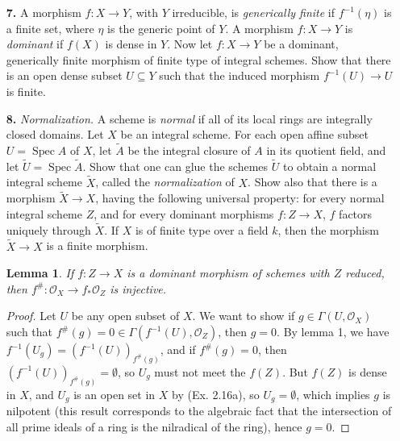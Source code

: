 \documentclass{article}
\newcommand{\OO}{\mathscr{O}}
\DeclareMathOperator{\spec}{Spec}
\newtheorem{lemma}{Lemma}
\begin{document}
\begin{enumerate} [label=\textbf{\arabic*.}, leftmargin=0em]
\item[\textbf{7.}] A morphism $f : X \to Y$, with $Y$ irreducible, is \textit{generically finite} if $f^{-1}(\eta)$ is a finite set, where $\eta$ is the generic point of $Y$. A morphism $f : X \to Y$ is \textit{dominant} if $f(X)$ is dense in $Y$. Now let $f : X \to Y$ be a dominant, generically finite morphism of finite type of integral schemes. Show that there is an open dense subset $U \subseteq Y$ such that the induced morphism $f^{-1}(U) \to U$ is finite.

\item[\textbf{8.}] \textit{Normalization.} A scheme is \textit{normal} if all of its local rings are integrally closed domains. Let $X$ be an integral scheme. For each open affine subset $U = \spec{A}$ of $X$, let $\tilde{A}$ be the integral closure of $A$ in its quotient field, and let $\tilde{U} = \spec{\tilde{A}}$. Show that one can glue the schemes $\tilde{U}$ to obtain a normal integral scheme $\tilde{X}$, called the \textit{normalization} of $X$. Show also that there is a morphism $\tilde{X} \to X$, having the following universal property: for every normal integral scheme $Z$, and for every dominant morphisms $f : Z \to X$, $f$ factors uniquely through $\tilde{X}$. If $X$ is of finite type over a field $k$, then the morphism $\tilde{X} \to X$ is a finite morphism.

\begin{lemma}
    If $f : Z \to X$ is a dominant morphism of schemes with $Z$ reduced, then $f^\# : \OO_X \to f_* \OO_Z$ is injective.    
\end{lemma}

\begin{proof}
    Let $U$ be any open subset of $X$. We want to show if $g \in \Gamma(U, \OO_X)$ such that $f^\#(g) = 0 \in \Gamma(f^{-1}(U), \OO_Z)$, then $g = 0$. By lemma 1, we have $f^{-1}(U_g) = (f^{-1}(U))_{f^\#(g)}$, and if $f^\#(g) = 0$, then $(f^{-1}(U))_{f^\#(g)} = \emptyset$, so $U_g$ must not meet the $f(Z)$. But $f(Z)$ is dense in $X$, and $U_g$ is an open set in $X$ by (Ex. 2.16a), so $U_g = \emptyset$, which implies $g$ is nilpotent (this result corresponds to the algebraic fact that the intersection of all prime ideals of a ring is the nilradical of the ring), hence $g = 0$.
\end{proof}


\end{enumerate}
\end{document}
